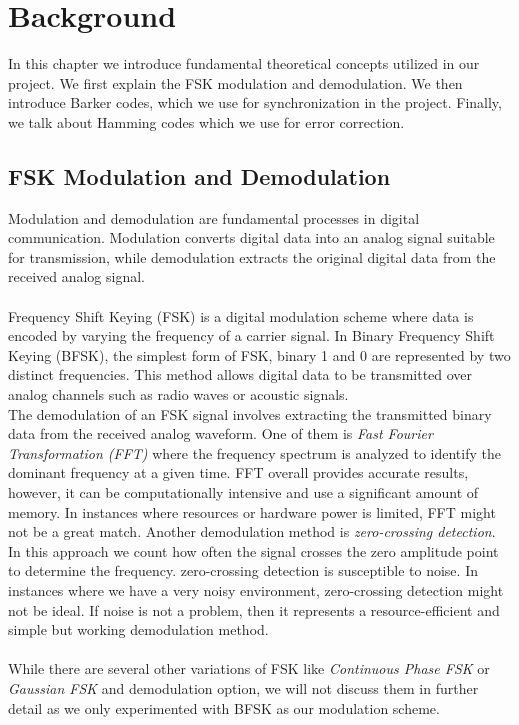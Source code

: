 \chapter{Background}
In this chapter we introduce fundamental theoretical concepts utilized in our project. We first explain the FSK modulation and demodulation. We then introduce Barker codes, which we use for synchronization in the project. Finally, we talk about Hamming codes which we use for error correction.

\section{FSK Modulation and Demodulation}
Modulation and demodulation are fundamental processes in digital communication. Modulation converts digital data into an analog signal suitable for transmission, while demodulation extracts the original digital data from the received analog signal. 
\\\\
Frequency Shift Keying (FSK) is a digital modulation scheme where data is encoded by varying the frequency of a carrier signal. In Binary Frequency Shift Keying (BFSK), the simplest form of FSK, binary 1 and 0 are represented by two distinct frequencies. This method allows digital data to be transmitted over analog channels such as radio waves or acoustic signals.
\\ 
The demodulation of an FSK signal involves extracting the transmitted binary data from the received analog waveform. One of them is \textit{Fast Fourier Transformation (FFT)} where the frequency spectrum is analyzed to identify the dominant frequency at a given time. FFT overall provides accurate results, however, it can be computationally intensive and use a significant amount of memory. In instances where resources or hardware power is limited, FFT might not be a great match. Another demodulation method is \textit{zero-crossing detection}. In this approach we count how often the signal crosses the zero amplitude point to determine the frequency. zero-crossing detection is susceptible to noise. In instances where we have a very noisy environment, zero-crossing detection might not be ideal. If noise is not a problem, then it represents a resource-efficient and simple but working demodulation method.
\\ \\
While there are several other variations of FSK like \textit{Continuous Phase FSK} or \textit{Gaussian FSK} and demodulation option, we will not discuss them in further detail as we only experimented with BFSK as our modulation scheme.


